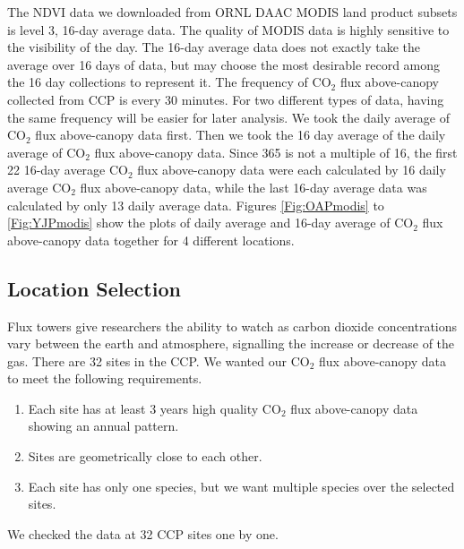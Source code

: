 \documentclass{article}
\begin{document}
The NDVI data we downloaded from ORNL DAAC MODIS land product subsets is level 3, 16-day average data. The quality of MODIS data is highly sensitive to the visibility of the day. The 16-day average data does not exactly take the average over 16 days of data, but may choose the most desirable record among the 16 day collections to represent it. 
The frequency of CO$_2$ flux above-canopy collected from CCP is every 30 minutes. For two different types of data, having the same frequency will be easier for later analysis. We took the daily average of CO$_2$ flux above-canopy data first. Then we took the 16 day average of the daily average of CO$_2$ flux above-canopy data. Since 365 is not a multiple of 16, the first 22 16-day average CO$_2$ flux above-canopy data were each calculated by 16 daily average CO$_2$ flux above-canopy data, while the last 16-day average data was calculated by only 13 daily average data. Figures \ref{Fig:OAPmodis} to \ref{Fig:YJPmodis} show the plots of daily average and 16-day average of CO$_2$ flux above-canopy data together for 4 different locations.

\subsection{Location Selection}

Flux towers give researchers the ability to watch as carbon dioxide concentrations vary between the earth and atmosphere, signalling the increase or decrease of the gas.
There are 32 sites in the CCP. We wanted our CO$_2$ flux above-canopy data to meet the following requirements.

\begin{enumerate}
\item Each site has at least 3 years high quality CO$_2$ flux above-canopy data showing an annual pattern.
\item Sites are geometrically close to each other.
\item Each site has only one species, but we want multiple species over the selected sites.
\end{enumerate}

We checked the data at 32 CCP sites one by one.
\end{document}
